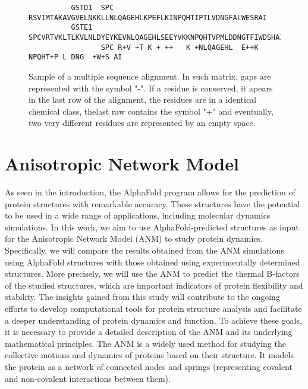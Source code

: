 \begin{figure}
	\label{MSA sample}
	\begin{verbatim}
          GSTD1  SPC-RSVIMTAKAVGVELNKKLLNLQAGEHLKPEFLKINPQHTIPTLVDNGFALWESRAI
          GSTE1  SPCVRTVKLTLKVLNLDYEYKEVNLQAGEHLSEEYVKKNPQHTVPMLDDNGTFIWDSHAI
                 SPC R+V +T K + ++   K +NLQAGEHL  E++K NPQHT+P L DNG  +W+S AI
	\end{verbatim}	
	\caption{Sample of a multiple sequence alignment. In such matrix, gaps are represented with the symbol "-". If a residue is conserved, it apears in the last row of the alignment, the residues are in a identical chemical class, thelast raw contains the symbol "+" and eventually, two very different residues are represented by an empty space.}
\end{figure}
\section{Anisotropic Network Model}
As seen in the introduction, the AlphaFold program allows for the prediction of protein structures with remarkable accuracy. These structures have the potential to be used in a wide range of applications, including molecular dynamics simulations. In this work, we aim to use AlphaFold-predicted structures as input for the Anisotropic Network Model (ANM) to study protein dynamics. Specifically, we will compare the results obtained from the ANM simulations using AlphaFold structures with those obtained using experimentally determined structures. More precisely, we will use the ANM to predict the thermal B-factors of the studied structures\cite{ANM-COM}, which are important indicators of protein flexibility and stability. The insights gained from this study will contribute to the ongoing efforts to develop computational tools for protein structure analysis and facilitate a deeper understanding of protein dynamics and function. To achieve these goals, it is necessary to provide a detailed description of the ANM and its underlying mathematical principles. The ANM is a widely used method for studying the collective motions and dynamics of proteins based on their structure. It models the protein as a network of connected nodes and springs (representing covalent and non-covalent interactions between them). 

